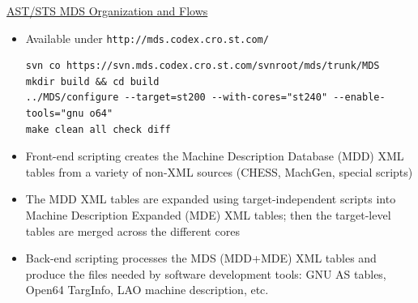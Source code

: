 \documentclass[a4]{seminar}
\begin{document}
\begin{slide}

\begin{center} \underline{AST/STS MDS Organization and Flows} \end{center}

\begin{itemize}

\item Available under \texttt{http://mds.codex.cro.st.com/}

{\scriptsize
\begin{verbatim}
svn co https://svn.mds.codex.cro.st.com/svnroot/mds/trunk/MDS
mkdir build && cd build
../MDS/configure --target=st200 --with-cores="st240" --enable-tools="gnu o64"
make clean all check diff
\end{verbatim}
}

\item Front-end scripting creates the Machine Description Database (MDD) XML
tables from a variety of non-XML sources (CHESS, MachGen, special scripts)

\item The MDD XML tables are expanded using target-independent scripts into
Machine Description Expanded (MDE) XML tables; then the target-level
tables are merged across the different cores

\item Back-end scripting processes the MDS (MDD+MDE) XML tables and produce the
files needed by software development tools:  GNU AS tables, Open64 TargInfo, LAO
machine description, etc.

\end{itemize}

\end{slide}


\begin{slide}

\begin{center}
\end{center}

\end{slide}
\end{document}
